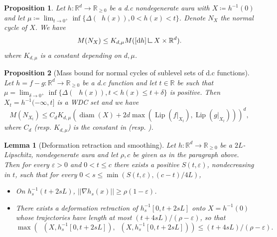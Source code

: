 \documentclass[10pt,a4paper]{amsart}
\newtheorem{lemma}{Lemma}
\newtheorem{proposition}{Proposition}
\newcommand{\R}{\mathbb{R}}
\DeclareMathOperator{\clarke}{\partial^{*} \! \!}
\DeclareMathOperator{\dacy}{\delta_{\mathrm{Acy}}}
\DeclareMathOperator{\dhom}{d_{\mathrm{Hom}}}
\DeclareMathOperator{\diam}{\mathrm{diam}}
\DeclareMathOperator{\diff}{\mathrm{d} \!}
\newcommand{\eps}{\varepsilon}
\DeclareMathOperator{\lip}{\mathrm{Lip}}
\newcommand{\mres}{\mathbin{\vrule height 1.6ex depth 0pt width 0.13ex\vrule height 0.13ex depth 0pt width 1.3ex}}
\newcommand{\norme}[1]{\left\lvert \left \lvert #1 \right \rvert \right \rvert}
\begin{document}
    \begin{proposition}
    \label{prop:normal_bound}
    Let $h : \R^d \to \R_{\geq 0}$ be a d.c nondegenerate aura with $X \coloneqq h^{-1}(  0 )$ and let $\mu \coloneqq \lim_{t \to 0^+} \inf \{ \Delta (\clarke h(x) ) ,  0 < h(x) < t \}$. Denote $N_X$ the normal cycle of $X$. We have 
    \begin{equation*}
     M(N_X) \leq K_{d, \mu} M( [\diff h] \mres X \times \R^d ).
    \end{equation*}
    where $K_{d, \mu}$ is a constant depending on $d, \mu$.
    \end{proposition}

\begin{proposition}[Mass bound for normal cycles of sublevel sets of d.c functions]
\label{prop:sub_dc_aura}
Let $h = f-g: \R^d \to \R_{\geq 0}$ be a d.c function and let $t \in \R$ be such that $\mu = \lim_{\delta \to 0^+} \inf \{\Delta(\clarke \, h(x)), t < h(x) \leq t + \delta \}$ is positive. Then $X_t = h^{-1}(-\infty, t]$ is a WDC set and we have
\begin{equation*}
    M(N_{X_t}) \leq C_d K_{d, \mu}( \diam(X)+ 2d\max(\lip(f|_{X_t}), \lip(g|_{X_t})))^d,
\end{equation*}
where $C_d$ (resp. $K_{d, \mu}$) is the constant in  (resp. ). 
    
\end{proposition}

\begin{lemma}[Deformation retraction and smoothing]
\label{lem:flot_lisse}
   Let $h: \R^d \to \R_{\geq 0}$ be a $2L$-Lipschitz, nondegenerate aura and let $\rho, c$ be given as in the paragraph above. Then for every $\eps > 0$ and $0 < t \leq c$ there exists a positive $S(t, \eps)$, nondecreasing in $t$, such that for every $0 < s \leq \min(S(t, \eps), (c - t)/4L)$, 
   \begin{itemize}
       \item On $h_s^{-1}(t + 2sL)$, $\norme{\nabla h_s(x)} \geq \rho(1 - \eps)$.
       \item There exists a deformation retraction of $h_s^{-1}[0,t + 2sL]$ onto $X = h^{-1}(0)$ whose trajectories have length at most $(t + 4sL)/(\rho - \eps)$, so that  
       \[ \max( \dhom(X, h_s^{-1}[0,t + 2sL]), \dacy(X, h_s^{-1}[0,t + 2sL])) \leq (t + 4sL)/(\rho - \eps).\]
   \end{itemize}
\end{lemma}
\end{document}
